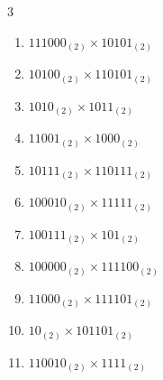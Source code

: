 


\setcounter{quesnum}{15}

\begin{multicols}{3}
\begin{enumerate}
  \itemsep=100pt
  \item $111000_{(2)} \times 10101_{(2)}$


  \item $10100_{(2)} \times 110101_{(2)}$


  \item $1010_{(2)} \times 1011_{(2)}$


  \item $11001_{(2)} \times 1000_{(2)}$


  \item $10111_{(2)} \times 110111_{(2)}$


\columnbreak %

  \item $100010_{(2)} \times 11111_{(2)}$


  \item $100111_{(2)} \times 101_{(2)}$


  \item $100000_{(2)} \times 111100_{(2)}$


  \item $11000_{(2)} \times 111101_{(2)}$


  \item $10_{(2)} \times 101101_{(2)}$


\columnbreak %

  \item $110010_{(2)} \times 1111_{(2)}$



\end{enumerate}
\end{multicols}

